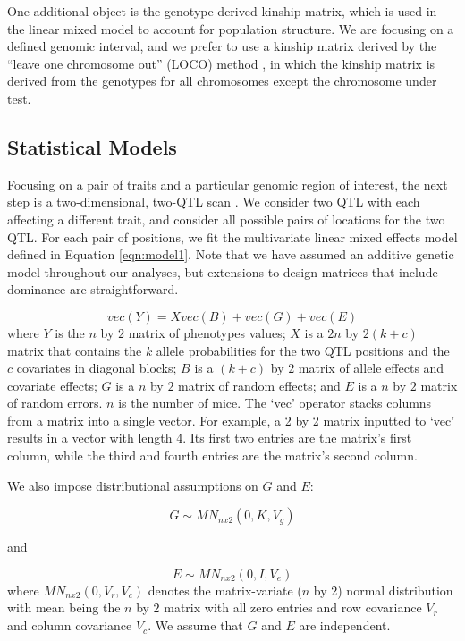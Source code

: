 \documentclass[12pt,twoside, lineno]{gsajnl}
\begin{document}
One additional object is the genotype-derived kinship matrix, which is
used in the linear mixed model to account for population structure. We
are focusing on a defined genomic interval, and we prefer to use a
kinship matrix derived by the ``leave one chromosome out'' (LOCO)
method \citep{yang2014advantages}, in which the kinship matrix is
derived from the genotypes for all chromosomes except the chromosome
under test.




\subsection{Statistical Models}

Focusing on a pair of traits and a particular genomic region of
interest, the next step is a two-dimensional, two-QTL
scan \citep{jiang1995multiple}. We consider two QTL with each
affecting a different trait, and consider all possible pairs of
locations for the two QTL. For each pair of positions, we fit
the multivariate linear mixed effects model defined in Equation
\ref{eqn:model1}. Note that we have
assumed an additive genetic model throughout our analyses, but
extensions to design matrices that include dominance are
straightforward.


\begin{equation}
vec(Y) = X vec(B) + vec(G) + vec(E)
\label{eqn:model1}
\end{equation}
where $Y$ is the $n$ by $2$ matrix of phenotypes values;
$X$ is a $2n$ by $2(k + c)$
matrix that contains the $k$ allele probabilities for the two QTL
positions and the $c$
covariates in diagonal blocks; $B$ is a $(k + c)$ by $2$ matrix of
allele effects and covariate effects; $G$ is a $n$ by $2$ matrix of
random effects; and $E$ is a $n$ by $2$ matrix of random errors. $n$
is the number of mice. The `vec' operator stacks columns from a matrix
into a single vector. For example, a 2 by 2 matrix inputted to `vec'
results in a vector with length 4. Its first two entries are the
matrix's first column, while the third and fourth entries are the
matrix's second column.


We also impose distributional assumptions on $G$ and $E$:

\begin{equation}
G \sim MN_{n x 2}(0, K, V_g)
\label{eqn:model2}
\end{equation}

and

\begin{equation}
E \sim MN_{nx2}(0, I, V_e)
\label{eqn:model3}
\end{equation}
where $MN_{n x 2}(0, V_r, V_c)$ denotes the matrix-variate ($n$ by 2)
normal distribution with mean being the $n$ by $2$ matrix with all
zero entries and row covariance $V_r$ and column covariance $V_c$. We
assume that $G$ and $E$ are independent.
\end{document}
